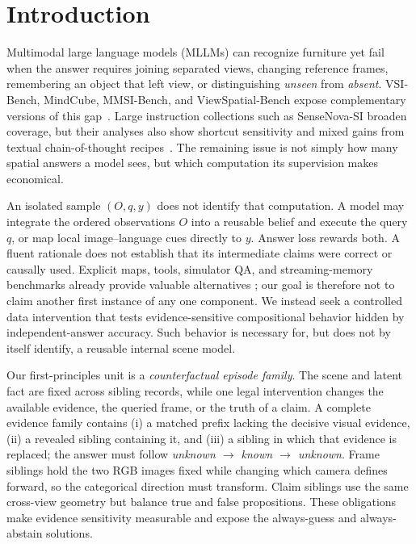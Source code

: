 \section{Introduction}
\label{sec:intro}

Multimodal large language models (MLLMs) can recognize furniture yet fail when
the answer requires joining separated views, changing reference frames,
remembering an object that left view, or distinguishing \emph{unseen} from
\emph{absent}.  VSI-Bench, MindCube, MMSI-Bench, and ViewSpatial-Bench expose
complementary versions of this gap~\citep{yang2024thinking,yin2025mindcube,
yang2025mmsi,li2025viewspatial}.  Large instruction collections such as
SenseNova-SI broaden coverage, but their analyses also show shortcut
sensitivity and mixed gains from textual chain-of-thought
recipes~\citep{cai2025sensenova}.  The remaining issue is not simply how many
spatial answers a model sees, but which computation its supervision makes
economical.



An isolated sample $(O,q,y)$ does not identify that computation.  A model may
integrate the ordered observations $O$ into a reusable belief and execute the
query $q$, or map local image--language cues directly to $y$.  Answer loss
rewards both.  A fluent rationale does not establish that its intermediate
claims were correct or causally used.  Explicit maps, tools, simulator QA, and
streaming-memory benchmarks already provide valuable alternatives
\citep{sprite2026,s3bench2026,cog3dmap2026,sagent2026}; our goal is therefore
not to claim another first instance of any one component.  We instead seek a
controlled data intervention that tests evidence-sensitive compositional
behavior hidden by independent-answer accuracy.  Such behavior is necessary
for, but does not by itself identify, a reusable internal scene model.

Our first-principles unit is a \emph{counterfactual episode family}.  The
scene and latent fact are fixed across sibling records, while one legal
intervention changes the available evidence, the queried frame, or the truth
of a claim.  A complete evidence family contains (i) a matched prefix lacking
the decisive visual evidence, (ii) a revealed sibling containing it, and
(iii) a sibling in which that evidence is replaced; the answer must follow
\emph{unknown $\rightarrow$ known $\rightarrow$ unknown}.  Frame siblings
hold the two RGB images fixed while changing which camera defines forward, so
the categorical direction must transform.  Claim siblings use the same
cross-view geometry but balance true and false propositions.  These
obligations make evidence sensitivity measurable and expose the always-guess
and always-abstain solutions.

